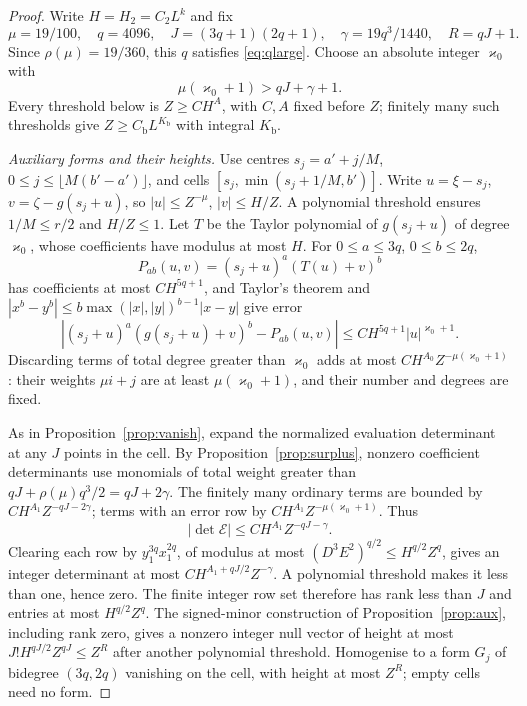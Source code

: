 \documentclass[11pt,reqno]{amsart}
\theoremstyle{definition}
\theoremstyle{remark}
\numberwithin{equation}{section}
\begin{document}
\begin{proof}
Write $H=H_2=C_2L^k$ and fix
\[
 \mu=19/100,\quad q=4096,\quad J=(3q+1)(2q+1),\quad
 \gamma=19q^3/1440,\quad R=qJ+1.
\]
Since $\rho(\mu)=19/360$, this $q$ satisfies \eqref{eq:qlarge}.
Choose an absolute integer $\varkappa_0$ with
\begin{equation}\label{eq:A3Taylororder}
 \mu(\varkappa_0+1)>qJ+\gamma+1.
\end{equation}
Every threshold below is $Z\ge CH^A$, with $C,A$ fixed before $Z$;
finitely many such thresholds give $Z\ge C_{\mathrm b}L^{K_{\mathrm b}}$
with integral $K_{\mathrm b}$.

\emph{Auxiliary forms and their heights.}
Use centres $s_j=a'+j/M$, $0\le j\le\lfloor M(b'-a')\rfloor$,
and cells $[s_j,\min(s_j+1/M,b')]$. Write
$u=\xi-s_j$, $v=\zeta-g(s_j+u)$, so $|u|\le Z^{-\mu}$,
$|v|\le H/Z$. A polynomial threshold ensures $1/M\le r/2$ and
$H/Z\le1$. Let $T$ be the Taylor polynomial of $g(s_j+u)$ of degree
$\varkappa_0$, whose coefficients have modulus at most $H$.
For $0\le a\le3q$, $0\le b\le2q$,
\[
 P_{ab}(u,v)=(s_j+u)^a(T(u)+v)^b
\]
has coefficients at most $CH^{5q+1}$, and Taylor's theorem and
$|x^b-y^b|\le b\max(|x|,|y|)^{b-1}|x-y|$ give error
\[
 |(s_j+u)^a(g(s_j+u)+v)^b-P_{ab}(u,v)|
 \le CH^{5q+1}|u|^{\varkappa_0+1}.
\]
Discarding terms of total degree greater than $\varkappa_0$ adds at most
$CH^{A_0}Z^{-\mu(\varkappa_0+1)}$: their weights $\mu i+j$ are
at least $\mu(\varkappa_0+1)$, and their number and degrees are fixed.

As in Proposition~\ref{prop:vanish}, expand the normalized evaluation
determinant at any $J$ points in the cell. By Proposition~\ref{prop:surplus},
nonzero coefficient determinants use monomials of total weight greater
than $qJ+\rho(\mu)q^3/2=qJ+2\gamma$. The finitely many ordinary terms
are bounded by $CH^{A_1}Z^{-qJ-2\gamma}$; terms with an error row by
$CH^{A_1}Z^{-\mu(\varkappa_0+1)}$. Thus
\[
 |\det\mathcal E|\le CH^{A_1}Z^{-qJ-\gamma}.
\]
Clearing each row by $y_1^{3q}x_1^{2q}$, of modulus at most
$(D^3E^2)^{q/2}\le H^{q/2}Z^q$, gives an integer determinant at most
$CH^{A_1+qJ/2}Z^{-\gamma}$. A polynomial threshold makes it less than
one, hence zero. The finite integer row set therefore has rank less
than $J$ and entries at most $H^{q/2}Z^q$. The signed-minor construction
of Proposition~\ref{prop:aux}, including rank zero, gives a nonzero
integer null vector of height at most $J!H^{qJ/2}Z^{qJ}\le Z^R$ after
another polynomial threshold. Homogenise to a form $G_j$ of bidegree
$(3q,2q)$ vanishing on the cell, with height at most $Z^R$; empty cells
need no form.


\end{proof}
\end{document}
